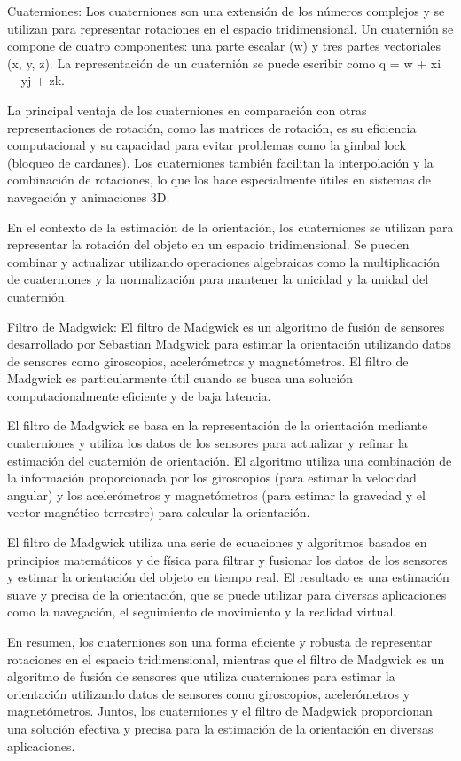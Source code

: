 Cuaterniones:
Los cuaterniones son una extensión de los números complejos y se utilizan para representar rotaciones en el espacio tridimensional. Un cuaternión se compone de cuatro componentes: una parte escalar (w) y tres partes vectoriales (x, y, z). La representación de un cuaternión se puede escribir como q = w + xi + yj + zk.

La principal ventaja de los cuaterniones en comparación con otras representaciones de rotación, como las matrices de rotación, es su eficiencia computacional y su capacidad para evitar problemas como la gimbal lock (bloqueo de cardanes). Los cuaterniones también facilitan la interpolación y la combinación de rotaciones, lo que los hace especialmente útiles en sistemas de navegación y animaciones 3D.

En el contexto de la estimación de la orientación, los cuaterniones se utilizan para representar la rotación del objeto en un espacio tridimensional. Se pueden combinar y actualizar utilizando operaciones algebraicas como la multiplicación de cuaterniones y la normalización para mantener la unicidad y la unidad del cuaternión.

Filtro de Madgwick:
El filtro de Madgwick es un algoritmo de fusión de sensores desarrollado por Sebastian Madgwick para estimar la orientación utilizando datos de sensores como giroscopios, acelerómetros y magnetómetros. El filtro de Madgwick es particularmente útil cuando se busca una solución computacionalmente eficiente y de baja latencia.

El filtro de Madgwick se basa en la representación de la orientación mediante cuaterniones y utiliza los datos de los sensores para actualizar y refinar la estimación del cuaternión de orientación. El algoritmo utiliza una combinación de la información proporcionada por los giroscopios (para estimar la velocidad angular) y los acelerómetros y magnetómetros (para estimar la gravedad y el vector magnético terrestre) para calcular la orientación.

El filtro de Madgwick utiliza una serie de ecuaciones y algoritmos basados en principios matemáticos y de física para filtrar y fusionar los datos de los sensores y estimar la orientación del objeto en tiempo real. El resultado es una estimación suave y precisa de la orientación, que se puede utilizar para diversas aplicaciones como la navegación, el seguimiento de movimiento y la realidad virtual.

En resumen, los cuaterniones son una forma eficiente y robusta de representar rotaciones en el espacio tridimensional, mientras que el filtro de Madgwick es un algoritmo de fusión de sensores que utiliza cuaterniones para estimar la orientación utilizando datos de sensores como giroscopios, acelerómetros y magnetómetros. Juntos, los cuaterniones y el filtro de Madgwick proporcionan una solución efectiva y precisa para la estimación de la orientación en diversas aplicaciones.

